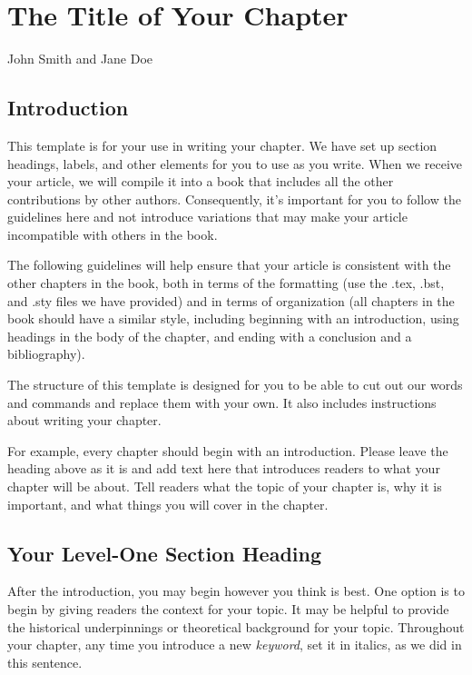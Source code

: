 \chapter{The Title of Your Chapter}{John Smith and Jane Doe}
 \label{Your-chapter}

\section{Introduction}

This template is for your use in writing your chapter. We have set up section headings, labels, and other elements for you to use as you write. When we receive your article, we will compile it into a book that includes all the other contributions by other authors. Consequently, it's important for you to follow the guidelines here and not introduce variations that may make your article incompatible with others in the book.

The following guidelines will help ensure that your article is consistent with the other chapters in the book, both in terms of the formatting (use the .tex, .bst, and .sty files we have provided) and in terms of organization (all chapters in the book should have a similar style, including beginning with an introduction, using headings in the body of the chapter, and ending with a conclusion and a bibliography).

The structure of this template is designed for you to be able to cut out our words and commands and replace them with your own. It also includes instructions about writing your chapter.

For example, every chapter should begin with an introduction. Please leave the heading above as it is and add text here that introduces readers to what your chapter will be about. Tell readers what the topic of your chapter is, why it is important, and what things you will cover in the chapter.

\section{Your Level-One Section Heading}\label{YourName:SectionLabel}

After the introduction, you may begin however you think is best. One option is to begin by giving readers the context for your topic. It may be helpful to provide the historical underpinnings or theoretical background for your topic. Throughout your chapter, any time you introduce a new \textit{keyword}, set it in italics, as we did in this sentence.


